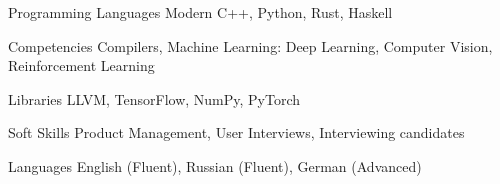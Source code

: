 
\begin{cvskills}

  \cvskill
    {Programming Languages}
    {Modern C++, Python, Rust, Haskell}

  \cvskill
    {Competencies}
    {Compilers, Machine Learning: Deep Learning, Computer Vision, Reinforcement
     Learning}

  \cvskill
    {Libraries}
    {LLVM, TensorFlow, NumPy, PyTorch}

  \cvskill
    {Soft Skills}
    {Product Management, User Interviews, Interviewing candidates}

  \cvskill
    {Languages}
    {English (Fluent), Russian (Fluent), German (Advanced)}

\end{cvskills}
